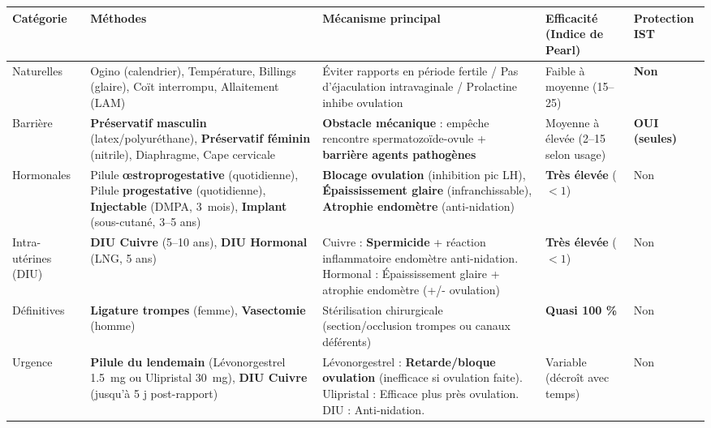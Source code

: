 \documentclass[11pt]{article}
\newcommand{\cle}[1]{{\popxbold\color{popdark}#1}}
\begin{document}
\begin{propriete}
\begin{center}
\begin{tabularx}{\linewidth}{|l|X|X|X|X|}\hline
\rowcolor{popblueL} \textbf{Catégorie} & \textbf{Méthodes} & \textbf{Mécanisme principal} & \textbf{Efficacité (Indice de Pearl)} & \textbf{Protection IST} \\ \hline
\cle{Naturelles} & Ogino (calendrier), Température, Billings (glaire), Coït interrompu, Allaitement (LAM) & Éviter rapports en période fertile / Pas d'éjaculation intravaginale / Prolactine inhibe ovulation & Faible à moyenne (15--25) & \textbf{Non} \\ \hline
\cle{Barrière} & \textbf{Préservatif masculin} (latex/polyuréthane), \textbf{Préservatif féminin} (nitrile), Diaphragme, Cape cervicale & \textbf{Obstacle mécanique} : empêche rencontre spermatozoïde-ovule + \textbf{barrière agents pathogènes} & Moyenne à élevée (2--15 selon usage) & \textbf{OUI (seules)} \\ \hline
\cle{Hormonales} & Pilule \textbf{œstroprogestative} (quotidienne), Pilule \textbf{progestative} (quotidienne), \textbf{Injectable} (DMPA, \SI{3}{mois}), \textbf{Implant} (sous-cutané, 3--5 ans) & \textbf{Blocage ovulation} (inhibition pic LH), \textbf{Épaississement glaire} (infranchissable), \textbf{Atrophie endomètre} (anti-nidation) & \textbf{Très élevée} ($< 1$) & Non \\ \hline
\cle{Intra-utérines (DIU)} & \textbf{DIU Cuivre} (5--10 ans), \textbf{DIU Hormonal} (LNG, 5 ans) & Cuivre : \textbf{Spermicide} + réaction inflammatoire endomètre anti-nidation. Hormonal : Épaississement glaire + atrophie endomètre (+/- ovulation) & \textbf{Très élevée} ($< 1$) & Non \\ \hline
\cle{Définitives} & \textbf{Ligature trompes} (femme), \textbf{Vasectomie} (homme) & Stérilisation chirurgicale (section/occlusion trompes ou canaux déférents) & \textbf{Quasi 100 \%} & Non \\ \hline
\cle{Urgence} & \textbf{Pilule du lendemain} (Lévonorgestrel \SI{1,5}{mg} ou Ulipristal \SI{30}{mg}), \textbf{DIU Cuivre} (jusqu'à 5 j post-rapport) & Lévonorgestrel : \textbf{Retarde/bloque ovulation} (inefficace si ovulation faite). Ulipristal : Efficace plus près ovulation. DIU : Anti-nidation. & Variable (décroît avec temps) & Non \\ \hline
\end{tabularx}
\end{center}
\end{propriete}
\end{document}
